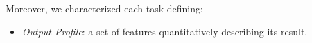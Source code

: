\documentclass[a4paper, 10pt, conference]{ieeeconf}      %
\begin{document}
\noindent Moreover, we characterized each task defining:
\begin{itemize}
    
    \item \textit{Output Profile}: a set of features quantitatively describing its result.
    

\end{itemize}
\end{document}
